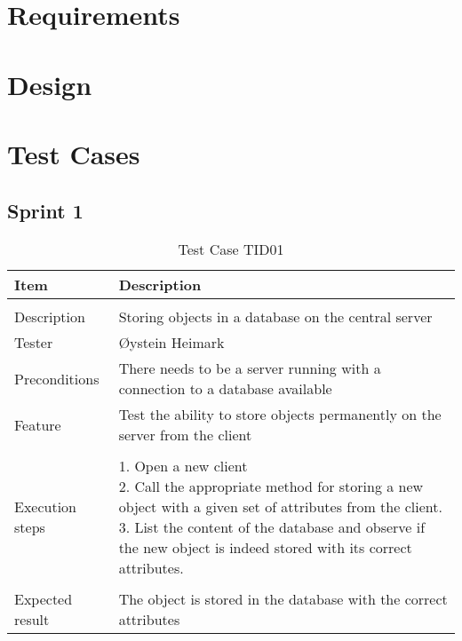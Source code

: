 \appendix

\clearpage

\chapter{Requirements}
\chapter{Design}


\chapter{Test Cases}
\section{Sprint 1}
\label{sec:sp1testcases}

\begin{table}[H]
\caption{Test Case TID01}
\centering
\begin{tabular}{ l p{13cm} }
\hline
 Item            & Description                                                              \\
\hline \\ [-2.0ex]
 Description     & Storing objects in a database on the central server                        \\
 Tester          & Øystein Heimark                  \\
 Preconditions   & There needs to be a server running with a connection to a database available \\
 Feature         & Test the ability to store objects permanently on the server from the client  \vspace{3pt}                     \\
\hline \\ [-1.5ex]
 Execution steps & \pbox{13cm}{1. Open a new client \\ 2. Call the appropriate method for storing a new object with a given set of attributes from the client. \\ 3. List the content of the database and observe if the new object is indeed stored with its correct attributes. } \vspace{3pt} \\
\hline \\ [-1.5ex]
 Expected result & The object is stored in the database with the correct attributes                                          \\
\hline
\end{tabular}
\label{table:testcasetid01}
\end{table}


